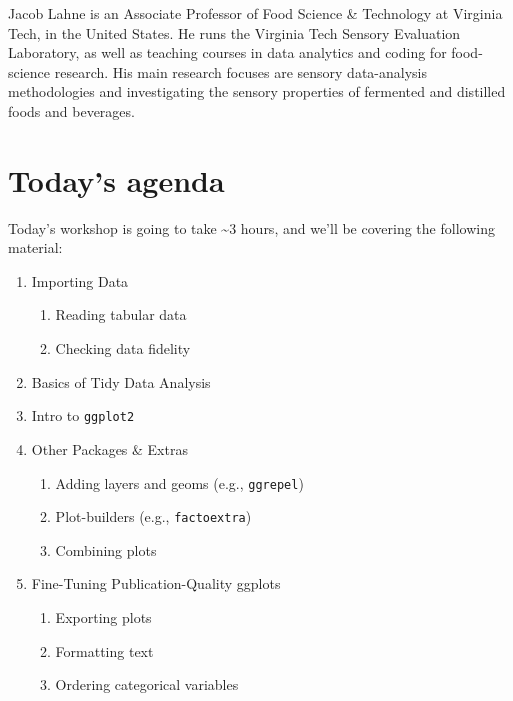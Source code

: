 \documentclass[
]{book}
\providecommand{\tightlist}{%
  \setlength{\itemsep}{0pt}\setlength{\parskip}{0pt}}
\begin{document}
Jacob Lahne is an Associate Professor of Food Science \& Technology at Virginia Tech, in the United States. He runs the Virginia Tech Sensory Evaluation Laboratory, as well as teaching courses in data analytics and coding for food-science research. His main research focuses are sensory data-analysis methodologies and investigating the sensory properties of fermented and distilled foods and beverages.

\hypertarget{todays-agenda}{%
\section*{Today's agenda}\label{todays-agenda}}

Today's workshop is going to take \textasciitilde3 hours, and we'll be covering the following material:

\begin{enumerate}
\def\labelenumi{\arabic{enumi}.}
\tightlist
\item
  Importing Data

  \begin{enumerate}
  \def\labelenumii{\arabic{enumii}.}
  \tightlist
  \item
    Reading tabular data
  \item
    Checking data fidelity
  \end{enumerate}
\item
  Basics of Tidy Data Analysis
\item
  Intro to \texttt{ggplot2}
\item
  Other Packages \& Extras

  \begin{enumerate}
  \def\labelenumii{\arabic{enumii}.}
  \tightlist
  \item
    Adding layers and geoms (e.g., \texttt{ggrepel})
  \item
    Plot-builders (e.g., \texttt{factoextra})
  \item
    Combining plots
  \end{enumerate}
\item
  Fine-Tuning Publication-Quality ggplots

  \begin{enumerate}
  \def\labelenumii{\arabic{enumii}.}
  \tightlist
  \item
    Exporting plots
  \item
    Formatting text
  \item
    Ordering categorical variables
  \end{enumerate}
\end{enumerate}
\end{document}
